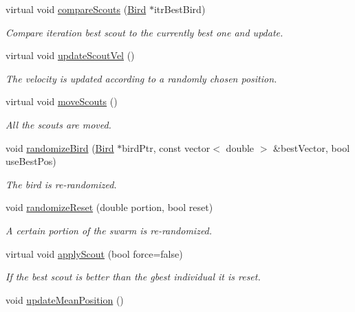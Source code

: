 \begin{CompactItemize}
virtual void \hyperlink{classSwarm_a2b011c3d98a6f761691a0e52bec6001}{compareScouts} (\hyperlink{classBird}{Bird} $\ast$itrBestBird)
\begin{CompactList}\small\item\em Compare iteration best scout to the currently best one and update. \item\end{CompactList}\item 
virtual void \hyperlink{classSwarm_9e891ddba8f8890e9f48a06067a76a73}{updateScoutVel} ()
\begin{CompactList}\small\item\em The velocity is updated according to a randomly chosen position. \item\end{CompactList}\item 
virtual void \hyperlink{classSwarm_4fc3581725e33c1fe2d089f5980d3454}{moveScouts} ()
\begin{CompactList}\small\item\em All the scouts are moved. \item\end{CompactList}\item 
void \hyperlink{classSwarm_7e8309edaf059226c469e7d6a05caddd}{randomizeBird} (\hyperlink{classBird}{Bird} $\ast$birdPtr, const vector$<$ double $>$ \&bestVector, bool useBestPos)
\begin{CompactList}\small\item\em The bird is re-randomized. \item\end{CompactList}\item 
void \hyperlink{classSwarm_93f011b4e32128da1ff11431ce98a577}{randomizeReset} (double portion, bool reset)
\begin{CompactList}\small\item\em A certain portion of the swarm is re-randomized. \item\end{CompactList}\item 
virtual void \hyperlink{classSwarm_8315401d37a75266d77f71a66660d1ae}{applyScout} (bool force=false)
\begin{CompactList}\small\item\em If the best scout is better than the gbest individual it is reset. \item\end{CompactList}\item 
void \hyperlink{classSwarm_40a832e5094cc0bef13d9c6ab83b98c5}{updateMeanPosition} ()

\end{CompactItemize}
